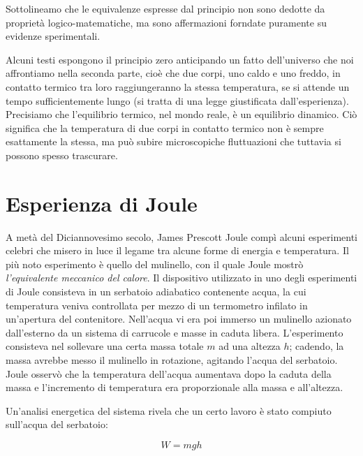 \noindent Sottolineamo che le equivalenze espresse dal principio non
sono dedotte da proprietà logico-matematiche, ma sono affermazioni
forndate puramente su evidenze sperimentali.

Alcuni testi espongono il principio zero anticipando un fatto dell'universo
che noi affrontiamo nella seconda parte, cioè che due corpi, uno caldo e
uno freddo, in contatto termico tra loro raggiungeranno la stessa temperatura,
se si attende un tempo sufficientemente lungo (si tratta di una legge giustificata
dall'esperienza). Precisiamo che l'equilibrio
termico, nel mondo reale, è un equilibrio dinamico. Ciò significa che
la temperatura di due corpi in contatto termico non è sempre esattamente la
stessa, ma può subire microscopiche fluttuazioni che tuttavia si possono
spesso trascurare.


\section{Esperienza di Joule}
A metà del Diciannovesimo secolo, James Prescott Joule compì alcuni
esperimenti celebri che misero in luce il legame tra alcune forme di
energia e temperatura. Il più noto esperimento è quello del mulinello,
con il quale Joule mostrò \textit{l'equivalente meccanico del calore}.
Il dispositivo utilizzato in uno degli esperimenti di Joule consisteva
in un serbatoio adiabatico contenente
acqua, la cui temperatura veniva controllata per mezzo di un termometro
infilato in un'apertura del contenitore. Nell'acqua vi era poi immerso
un mulinello azionato dall'esterno da un sistema di carrucole e masse
in caduta libera. L'esperimento consisteva nel sollevare una certa
massa totale $m$ ad una altezza $h$; cadendo, la massa avrebbe messo
il mulinello in rotazione, agitando l'acqua del serbatoio. Joule
osservò che la temperatura dell'acqua aumentava dopo la caduta della
massa e l'incremento di temperatura era proporzionale alla massa e all'altezza.

Un'analisi energetica del sistema rivela che un certo lavoro è
stato compiuto sull'acqua del serbatoio:

\[ W = mgh \]

